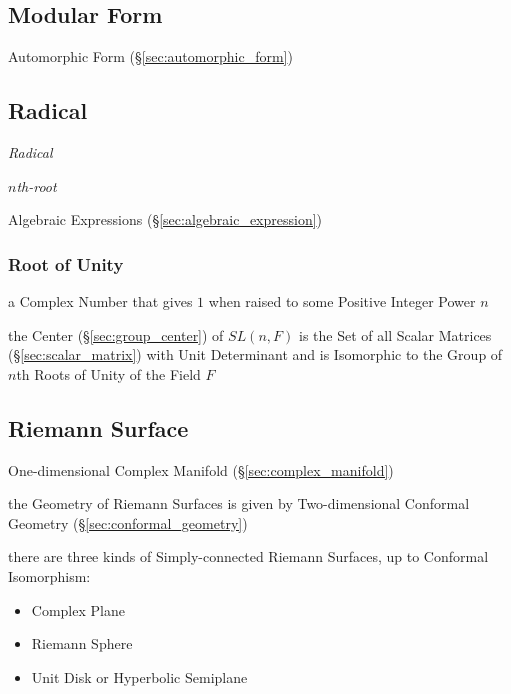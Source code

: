 \subsection{Modular Form}\label{sec:modular_form}

Automorphic Form (\S\ref{sec:automorphic_form})



\subsection{Radical}\label{sec:radical}

\emph{Radical}

\emph{$n$th-root}

Algebraic Expressions (\S\ref{sec:algebraic_expression})



\subsubsection{Root of Unity}\label{sec:unity_root}

a Complex Number that gives $1$ when raised to some Positive Integer Power $n$

the Center (\S\ref{sec:group_center}) of $SL(n,F)$ is the Set of all Scalar
Matrices (\S\ref{sec:scalar_matrix}) with Unit Determinant and is Isomorphic to
the Group of $n$th Roots of Unity of the Field $F$



\subsection{Riemann Surface}\label{sec:riemann_surface}

One-dimensional Complex Manifold (\S\ref{sec:complex_manifold})

the Geometry of Riemann Surfaces is given by Two-dimensional Conformal
Geometry (\S\ref{sec:conformal_geometry})

there are three kinds of Simply-connected Riemann Surfaces, up to Conformal
Isomorphism:
\begin{itemize}
  \item Complex Plane
  \item Riemann Sphere
  \item Unit Disk or Hyperbolic Semiplane
\end{itemize}



